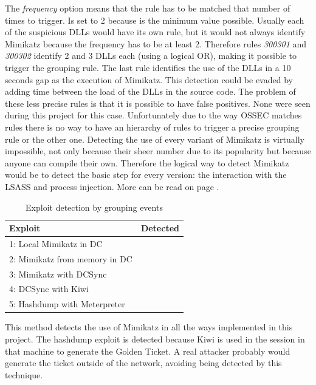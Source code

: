\linej
The \textit{frequency} option means that the rule has to be matched that number of times to trigger. Is set to 2 because is the minimum value possible.
\linej
\linej
Usually each of the suspicious DLLs would have its own rule, but it would not always identify Mimikatz because the frequency has to be at least 2. Therefore rules \textit{300301} and \textit{300302} identify 2 and 3 DLLs each (using a logical OR), making it possible to trigger the grouping rule.
The last rule identifies the use of the DLLs in a 10 seconds gap as the execution of Mimikatz. This detection could be evaded by adding time between the load of the DLLs in the source code.
\linej
\linej
The problem of these less precise rules is that it is possible to have false positives. None were seen during this project for this case.
\linej
Unfortunately due to the way OSSEC matches rules there is no way to have an hierarchy of rules to trigger a precise grouping rule or the other one.
\linej
\linej
Detecting the use of every variant of Mimikatz is virtually impossible, not only because their sheer number due to its popularity but because anyone can compile their own. Therefore the logical way to detect Mimikatz would be to detect the basic step for every version: the interaction with the LSASS and process injection. More can be read on page \pageref{detect_lsass}.

\begin{table}[H]
	\centering
	\begin{tabular}{|l|l|}
		\hline
		\rowcolor{gray!30}
		Exploit & Detected \\ \hline
		1: Local Mimikatz in DC& \RYES\\ \hline
		2: Mimikatz from memory in DC& \RYES\\ \hline
		3: Mimikatz with DCSync& \RYES\\ \hline
		4: DCSync with Kiwi& \RYES\\ \hline
		5: Hashdump with Meterpreter& \RYES\\ \hline
	\end{tabular}
	\caption{Exploit detection by grouping events}
\end{table}
This method detects the use of Mimikatz in all the ways implemented in this project.
The hashdump exploit is detected because Kiwi is used in the session in that machine to generate the Golden Ticket. A real attacker probably would generate the ticket outside of the network, avoiding being detected by this technique.

